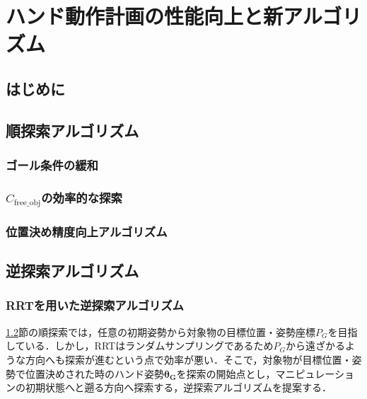 \documentclass[a4paper,twoside,12pt,papersize, dvipdfmx]{iirthesis}
\begin{document}
    \newcommand{\figref}[1]{\figurename\ref{#1}}
    \newcommand{\tabref}[1]{\tablename\ref{#1}}
    \renewcommand{\eqref}[1]{式~(\ref{#1})}
    \newcommand{\chapref}[1]{\ref{#1}章}
    \newcommand{\secref}[1]{\ref{#1}節}
    \newcommand{\ssecref}[1]{\ref{#1}項}
    \newcommand{\appref}[1]{付録\ref{#1}}
\fi


\chapter{ハンド動作計画の性能向上と新アルゴリズム}\label{chap::planner}
\minitoc

\section{はじめに}\label{sec::planner::intro}

\section{順探索アルゴリズム}\label{sec::planner::straight}
\subsection{ゴール条件の緩和}
\subsection{$C_{\mathrm{free\_obj}}$の効率的な探索}
\subsection{位置決め精度向上アルゴリズム}


\section{逆探索アルゴリズム}\label{sec::planner::reverse}
\subsection{RRTを用いた逆探索アルゴリズム}
\secref{sec::planner::straight}の順探索では，任意の初期姿勢から対象物の目標位置・姿勢座標$P_G$を目指している．しかし，RRTはランダムサンプリングであるため$P_G$から遠ざかるような方向へも探索が進むという点で効率が悪い．そこで，対象物が目標位置・姿勢で位置決めされた時のハンド姿勢$\bm{\theta_G}$を探索の開始点とし，マニピュレーションの初期状態へと遡る方向へ探索する，逆探索アルゴリズムを提案する．
\end{document}
